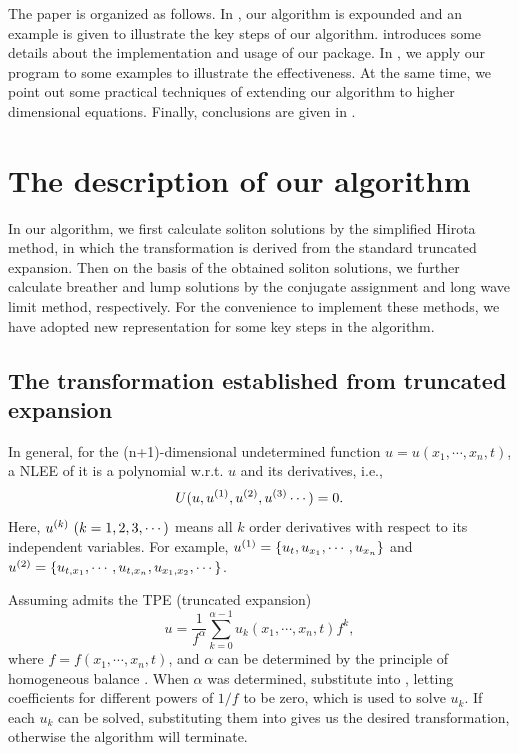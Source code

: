The paper is organized as follows. In , our algorithm is expounded and an example is given to illustrate the key steps of our algorithm.  introduces some details about the implementation and usage of our package. In , we apply our program to some examples to illustrate the effectiveness. At the same time, we point out some practical techniques of extending our algorithm to higher dimensional equations. Finally, conclusions are given in . 

\section{The description  of our algorithm}\label{Method-01}
In our algorithm, we first calculate soliton solutions by the simplified Hirota method, in which the transformation is derived from the standard truncated \Painleve{} expansion.  Then on the basis of the obtained soliton solutions, we further calculate breather and lump solutions by the conjugate assignment  and long wave limit method, respectively. For the convenience to implement these methods, we have adopted new representation for some key steps in the algorithm.  

\subsection{The transformation established from truncated \Painleve{} expansion}
In general, for the (n+1)-dimensional undetermined function $u=u(x_1,\cdots,x_n,t)$, a NLEE of it is a polynomial w.r.t. $u$ and its derivatives, i.e.,
\begin{equation}
    U(u,u^{(1)},u^{(2)},u^{(3)}\cdots)=0. \label{oeq}
\end{equation}
Here, $u^{(k)}~(k=1,2,3,\cdots)$ means all $k$ order derivatives with respect to its independent variables. For example, $u^{(1)}=\left\{u_t,u_{x_1},\cdots,u_{x_n}\right\}$ and $u^{(2)}=\left\{u_{t,x_1},\cdots,u_{t,x_n},u_{x_1,x_2},\cdots\right\}$.

Assuming  admits the TPE (truncated \Painleve{} expansion) \cite{xu2004symbolic,xu2009note}
\begin{equation}
    u=\frac{1}{f^\alpha}\sum_{k=0}^{\alpha-1}{u_k(x_1,\cdots,x_n,t) f^k}, \label{tr}
\end{equation}
where $f=f(x_1,\cdots,x_n,t)$, and $\alpha$ can be determined by the principle of homogeneous balance \cite{wang1995solitary,wang1996application}. When $\alpha$ was determined, substitute  into , letting coefficients for different powers of $1/f$ to be zero, which is used to solve $u_k$. If each $u_k$ can be solved, substituting them into  gives us the desired transformation, otherwise the algorithm will terminate.

